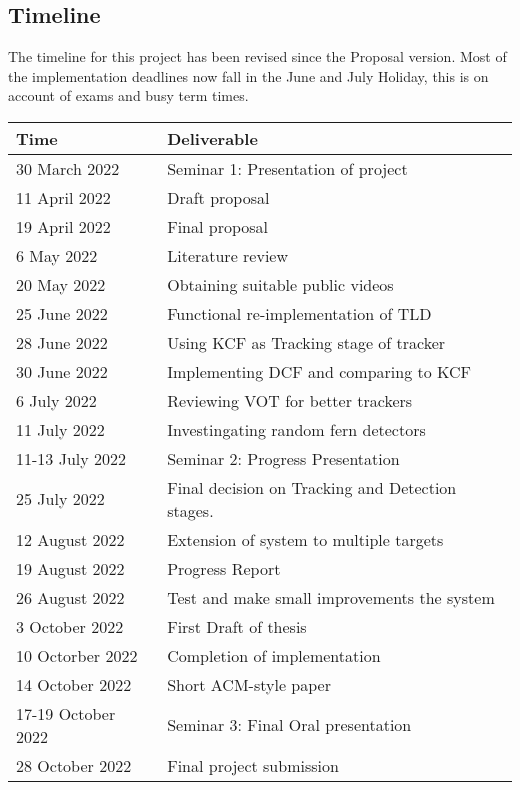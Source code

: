 \subsection{Timeline}
The timeline for this project has been revised since the Proposal version.
Most of the implementation deadlines now fall in the June and July Holiday, this is on account of exams and busy term times.
\begin{center}
  \begin{tabular}{l l}
    \toprule
      Time & Deliverable\\
    \midrule
      30 March 2022     & Seminar 1: Presentation of project\\
      11 April 2022     & Draft proposal\\
      19 April 2022     & Final proposal\\
      6 May 2022        & Literature review\\
      20 May 2022       & Obtaining suitable public videos\\
      25 June 2022      & Functional re-implementation of TLD\\
      28 June 2022      & Using KCF as Tracking stage of tracker\\
      30 June 2022      & Implementing DCF and comparing to KCF\\
      6 July 2022       & Reviewing VOT for better trackers\\
      11 July 2022      & Investingating random fern detectors\\
      11-13 July 2022   & Seminar 2: Progress Presentation\\
      25 July 2022      & Final decision on Tracking and Detection stages.\\
      12 August 2022    & Extension of system to multiple targets\\
      19 August 2022    & Progress Report\\
      26 August 2022    & Test and make small improvements the system\\
      3 October 2022    & First Draft of thesis\\
      10 Octorber 2022  & Completion of implementation\\
      14 October 2022   & Short ACM-style paper\\
      17-19 October 2022& Seminar 3: Final Oral presentation\\
      28 October 2022   & Final project submission\\
    \bottomrule
  \end{tabular}
\end{center}
